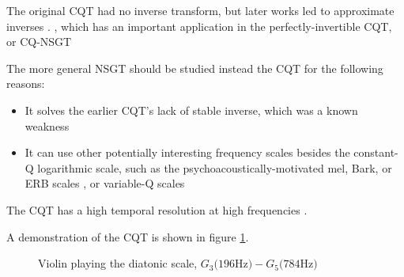 \documentclass[report.tex]{subfiles}
\begin{document}
The original CQT had no inverse transform, but later works led to approximate inverses \cite{klapuricqt, fitzgeraldcqt}. 
, which has an important application in the perfectly-invertible CQT, or CQ-NSGT \cite{invertiblecqt}

The more general NSGT should be studied instead the CQT for the following reasons:
\begin{itemize}
	\item
		It solves the earlier CQT's \cite{jbrown, klapuricqt, fitzgeraldcqt} lack of stable inverse, which was a known weakness \cite{lackinverse}
	\item
		It can use other potentially interesting frequency scales besides the constant-Q logarithmic scale, such as the psychoacoustically-motivated mel, Bark, or ERB scales , or variable-Q scales 
\end{itemize}

 The CQT has a high temporal resolution at high frequencies \cite{cqtransient} .

 A demonstration of the CQT is shown in figure \ref{fig:earlycqt}.

\begin{figure}[ht]
	\centering
	\caption{Violin playing the diatonic scale, $G_{3} \text{(196Hz)} - G_{5} \text{(784Hz)}$}
	\label{fig:earlycqt}
\end{figure}
\end{document}
